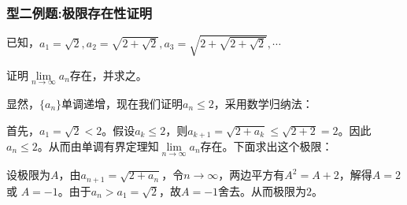 \documentclass[cn,12pt,chinese]{elegantbook}
\begin{document}
    \subsubsection*{型二例题:极限存在性证明}
    \begin{example}
        已知，$a_1=\sqrt{2}, a_2=\sqrt{2+\sqrt{2}}, a_3=\sqrt{2+\sqrt{2+\sqrt{2}}}, \cdots$

        证明$\lim\limits_{n \to \infty}a_n$存在，并求之。
    \end{example}
    \begin{solution}
        显然，$ \{a_n\} $单调递增，现在我们证明$ a_n \leq 2$，采用数学归纳法：

        首先，$ a_1=\sqrt{2}<2 $。假设$a_k\leq 2$，则$a_{k+1} =\sqrt{2+a_k}\leq \sqrt{2+2}=2$。因此 $a_n \leq 2$。从而由单调有界定理知$\lim\limits_{n \to \infty}a_n$存在。下面求出这个极限：

        设极限为$A$，由$a_{n+1}=\sqrt{2+a_n}$，令$ n \to \infty $，两边平方有$ A^2=A+2 $，解得$ A=2 $或 $ A=-1 $。由于$a_n>a_1=\sqrt{2}$，故$ A=-1 $舍去。从而极限为$ 2 $。
    \end{solution}
\end{document}
